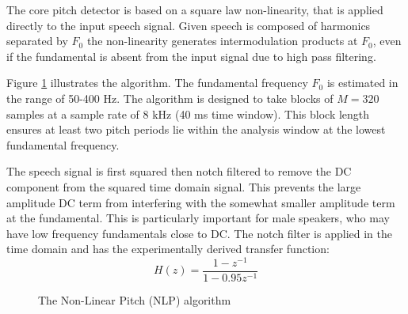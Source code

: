 \documentclass{article}
\begin{document}
The core pitch detector is based on a square law non-linearity, that is applied directly to the input speech signal. Given speech is composed of harmonics separated by $F_0$ the non-linearity generates intermodulation products at $F_0$, even if the fundamental is absent from the input signal due to high pass filtering.

Figure \ref{fig:nlp} illustrates the algorithm. The fundamental frequency $F_0$ is estimated in the range of 50-400 Hz. The algorithm is designed to take blocks of $M = 320$ samples at a sample rate of 8 kHz (40 ms time window). This block length ensures at least two pitch periods lie within the analysis window at the lowest fundamental frequency.

The speech signal is first squared then notch filtered to remove the DC component from the squared time domain signal. This prevents the large amplitude DC term from interfering with the somewhat smaller amplitude term at the fundamental. This is particularly important for male speakers, who may have low frequency fundamentals close to DC. The notch filter is applied in the time domain and has the experimentally derived transfer function:
\begin{equation}
H(z) = \frac{1-z^{-1}}{1-0.95z^{-1}}
\end{equation}

\begin{figure}[h]
\caption{The Non-Linear Pitch (NLP) algorithm}
\label{fig:nlp}
\begin{center}
\end{center}
\end{figure}
\end{document}
